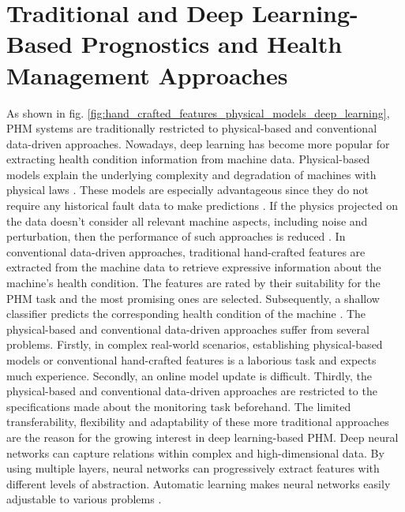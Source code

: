 \section{Traditional and Deep Learning-Based Prognostics and Health Management Approaches}
As shown in fig. \ref{fig:hand_crafted_features_physical_models_deep_learning}, PHM systems are traditionally restricted to physical-based and conventional data-driven approaches. Nowadays, deep learning has become more popular for extracting health condition information from machine data. Physical-based models explain the underlying complexity and degradation of machines with physical laws \cite{ZHAO2019213}. These models are especially advantageous since they do not require any historical fault data to make predictions \cite{Benker2019}. If the physics projected on the data doesn't consider all relevant machine aspects, including noise and perturbation, then the performance of such approaches is reduced \cite{ZHAO2019213}. In conventional data-driven approaches, traditional hand-crafted features are extracted from the machine data to retrieve expressive information about the machine's health condition. The features are rated by their suitability for the PHM task and the most promising ones are selected. Subsequently, a shallow classifier predicts the corresponding health condition of the machine \cite{ZHAO2019213}. The physical-based and conventional data-driven approaches suffer from several problems. Firstly, in complex real-world scenarios, establishing physical-based models or conventional hand-crafted features is a laborious task and expects much experience. Secondly, an online model update is difficult. Thirdly, the physical-based and conventional data-driven approaches are restricted to the specifications made about the monitoring task beforehand. The limited transferability, flexibility and adaptability of these more traditional approaches are the reason for the growing interest in deep learning-based PHM. Deep neural networks can capture relations within complex and high-dimensional data. By using multiple layers, neural networks can progressively extract features with different levels of abstraction. Automatic learning makes neural networks easily adjustable to various problems \cite{ZHAO2019213}.
